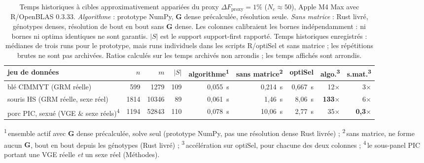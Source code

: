 \documentclass[11pt]{article}
\newcommand{\bG}{\mathbf{G}}
\begin{document}
\begin{table}[ht]
\centering
\caption{Temps historiques à cibles approximativement appariées du proxy $\Delta F_{\mathrm{proxy}}=1\%$ ($N_e\approx50$), Apple M4 Max avec R/OpenBLAS 0.3.33. \emph{Algorithme} : prototype NumPy, $\bG$ dense précalculée, résolution seule. \emph{Sans matrice} : Rust livré, génotypes denses, résolution de bout en bout sans $\bG$ dense. Les colonnes calibraient les bornes indépendamment : ni bornes ni optima identiques ne sont garantis. $|S|$ est le support support-first rapporté. Temps historiques enregistrés : médianes de trois runs pour le prototype, mais runs individuels dans les scripts R/optiSel et sans matrice ; les répétitions brutes ne sont pas archivées. Ratios calculés sur les temps archivés non arrondis ; les temps affichés sont arrondis.}
\label{tab:optisel}
\footnotesize\setlength{\tabcolsep}{3.5pt}
\begin{tabular}{lrrrrrrrr}
\toprule
jeu de données & $n$ & $m$ & $|S|$ & algorithme\textsuperscript{1} & sans matrice\textsuperscript{2} & optiSel & algo.\textsuperscript{3} & s.mat.\textsuperscript{3} \\
\midrule
blé CIMMYT (GRM réelle)             & 599  & 1279  & 109 & 0,055~s & 0,214~s & 0,667~s & 12$\times$ & 3$\times$ \\
souris HS (GRM réelle, sexe réel)   & 1814 & 10346 & 89  & 0,061~s & 1,46~s  & 8,06~s  & \textbf{133$\times$} & 6$\times$ \\
porc PIC, sexué (VGE \& sexe réels)\textsuperscript{4} & 1194 & 52843 & 110 & 0,078~s & 10,06~s & 2,77~s & 35$\times$ & \textbf{0,3$\times$} \\
\bottomrule
\end{tabular}
\end{table}

\noindent\textsuperscript{1}\,ensemble actif avec $\bG$ dense précalculée, solve seul (prototype NumPy, pas une résolution dense Rust livrée) ; \textsuperscript{2}\,sans matrice, ne forme aucun $\bG$, bout en bout depuis les génotypes (Rust livré) ; \textsuperscript{3}\,accélération sur optiSel, pour chacune des deux colonnes ; \textsuperscript{4}\,le sous-panel PIC portant une VGE réelle \emph{et} un sexe réel (Méthodes).
\end{document}
